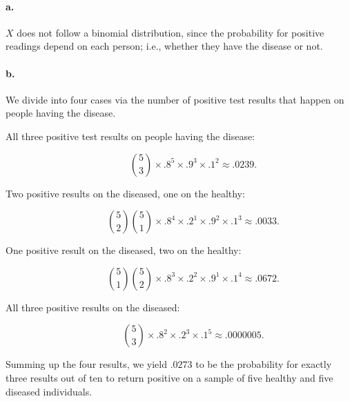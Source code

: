 \documentclass{exam}
\begin{document}
\paragraph{a.}
$X$ does not follow a binomial distribution, since the probability for positive readings depend on each person; i.e., whether they have the disease or not.

\paragraph{b.}
We divide into four cases via the number of positive test results that happen on people having the disease.
\begin{description}
	\item[All three positive test results on people having the disease:]
	\[
		\binom53 \times .8^5 \times .9^3 \times .1^2 \approx .0239. 
	\]
	\item[Two positive results on the diseased, one on the healthy:]
	\[
		\binom52\binom51 \times .8^4 \times .2^1 \times .9^2 \times .1^3 \approx .0033.
	\]
	\item[One positive result on the diseased, two on the healthy:]
	\[
		\binom51\binom52 \times .8^3 \times .2^2 \times .9^1 \times .1^4 \approx .0672.
	\]
	\item[All three positive results on the diseased:]
	\[
		\binom53 \times .8^2 \times .2^3 \times .1^5 \approx .0000005.
	\]
\end{description}
Summing up the four results, we yield $.0273$ to be the probability for exactly three results out of ten to return positive on a sample of five healthy and five diseased individuals.
\end{document}

